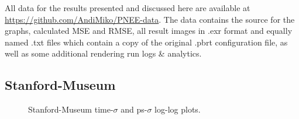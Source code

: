All data for the results presented and discussed here are available at \url{https://github.com/AndiMiko/PNEE-data}. The data contains the source for the graphs, calculated MSE and RMSE, all result images in .exr format and equally named .txt files which contain a copy of the original .pbrt configuration file, as well as some additional rendering run logs \& analytics.

\subsection{Stanford-Museum}
\label{sec:sm_eval}

\label{ch:ev:photontree}
\label{ch:ev:cdftree}

\begin{figure}
    \centering
    \begin{subfigure}{.5\textwidth}
      \centering
        \caption{}
        \label{fig:smmain_t}
    \end{subfigure}%
    \begin{subfigure}{.5\textwidth}
        \caption{}
        \label{fig:smmain_ps}
    \end{subfigure}
    \caption{Stanford-Museum time-$\sigma$ and ps-$\sigma$ log-log plots.}
    \label{fig:smmain}
\end{figure}


